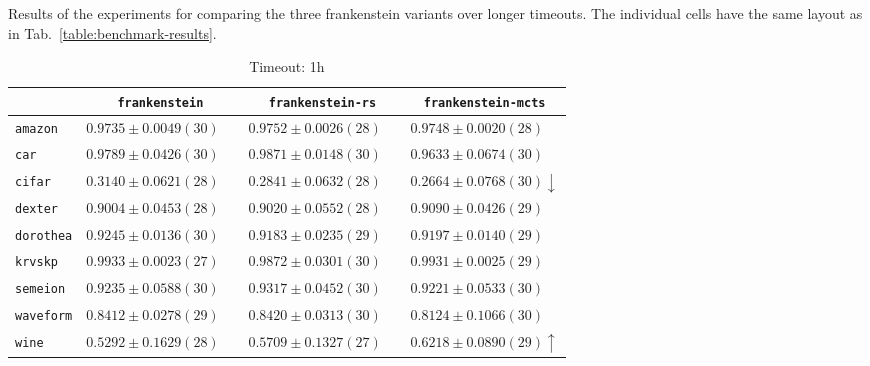 \begin{table}[ht]
    \caption[Results of the experiments for comparing the three frankenstein variants over longer timeouts.]{
        Results of the experiments for comparing the three frankenstein variants over longer timeouts.
        The individual cells have the same layout as in Tab.~\ref{table:benchmark-results}.
    }
    \label{table:influence-results}
    \renewcommand{\arraystretch}{1.25}
    \begin{subtable}{\textwidth}
        \centering
        \caption{Timeout: 1h}
        \begin{tabular}{l|ccc}
            & \texttt{frankenstein}  & \texttt{frankenstein-rs}  & \texttt{frankenstein-mcts} \\
            \hline
            \texttt{amazon} & $ 0.9735 \pm 0.0049 (30) \phantom{\downarrow}$ & $ 0.9752 \pm 0.0026 (28) \phantom{\downarrow}$ & $ 0.9748 \pm 0.0020 (28) \phantom{\downarrow}$\\
            \texttt{car} & $ 0.9789 \pm 0.0426 (30) \phantom{\downarrow}$ & $ 0.9871 \pm 0.0148 (30) \phantom{\downarrow}$ & $ 0.9633 \pm 0.0674 (30) \phantom{\downarrow}$\\
            \texttt{cifar} & $ 0.3140 \pm 0.0621 (28) \phantom{\downarrow}$ & $ 0.2841 \pm 0.0632 (28) \phantom{\downarrow}$ & $ 0.2664 \pm 0.0768 (30) \downarrow$\\
            \texttt{dexter} & $ 0.9004 \pm 0.0453 (28) \phantom{\downarrow}$ & $ 0.9020 \pm 0.0552 (28) \phantom{\downarrow}$ & $ 0.9090 \pm 0.0426 (29) \phantom{\downarrow}$\\
            \texttt{dorothea} & $ 0.9245 \pm 0.0136 (30) \phantom{\downarrow}$ & $ 0.9183 \pm 0.0235 (29) \phantom{\downarrow}$ & $ 0.9197 \pm 0.0140 (29) \phantom{\downarrow}$\\
            \texttt{krvskp} & $ 0.9933 \pm 0.0023 (27) \phantom{\downarrow}$ & $ 0.9872 \pm 0.0301 (30) \phantom{\downarrow}$ & $ 0.9931 \pm 0.0025 (29) \phantom{\downarrow}$\\
            \texttt{semeion} & $ 0.9235 \pm 0.0588 (30) \phantom{\downarrow}$ & $ 0.9317 \pm 0.0452 (30) \phantom{\downarrow}$ & $ 0.9221 \pm 0.0533 (30) \phantom{\downarrow}$\\
            \texttt{waveform} & $ 0.8412 \pm 0.0278 (29) \phantom{\downarrow}$ & $ 0.8420 \pm 0.0313 (30) \phantom{\downarrow}$ & $ 0.8124 \pm 0.1066 (30) \phantom{\downarrow}$\\
            \texttt{wine} & $ 0.5292 \pm 0.1629 (28) \phantom{\downarrow}$ & $ 0.5709 \pm 0.1327 (27) \phantom{\downarrow}$ & $ 0.6218 \pm 0.0890 (29) \uparrow$\\

\end{tabular}
\end{subtable}
\end{table}
